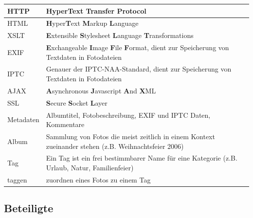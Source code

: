 \documentclass[a4paper,12pt,liststotocnumbered]{scrartcl}
\begin{document}
\begin{tabularx}{\textwidth}{|l|X|}
	\hline

	HTTP&\textbf{H}yper\textbf{T}ext \textbf{T}ransfer \textbf{P}rotocol\\

	\hline

	HTML&\textbf{H}yper\textbf{T}ext \textbf{M}arkup \textbf{L}anguage\\

	\hline

	XSLT&\textbf{E}xtensible \textbf{S}tylesheet \textbf{L}anguage
	\textbf{T}ransformations\\

	\hline

	EXIF&\textbf{E}xchangeable \textbf{I}mage \textbf{F}ile
	\textbf{F}ormat, dient zur Speicherung von Textdaten in Fotodateien\\

	\hline

	IPTC&Genauer der IPTC-NAA-Standard, dient zur Speicherung von
	Textdaten in Fotodateien\\

	\hline

	AJAX&\textbf{A}synchronous \textbf{J}avascript \textbf{A}nd
	\textbf{X}ML\\

	\hline

	SSL&\textbf{S}ecure \textbf{S}ocket \textbf{L}ayer\\
	\hline

	Metadaten&Albumtitel, Fotobeschreibung, EXIF und IPTC Daten,
	Kommentare\\

	\hline

	Album&Sammlung von Fotos die meist zeitlich in einem Kontext
	zueinander stehen (z.B. Weihnachtsfeier 2006)\\

	\hline

	Tag&Ein Tag ist ein frei bestimmbarer Name für eine Kategorie (z.B.
	Urlaub, Natur, Familienfeier)\\

	\hline

	taggen&zuordnen eines Fotos zu einem Tag\\

	\hline
\end{tabularx}

\newpage

\subsection{Beteiligte}
\end{document}
